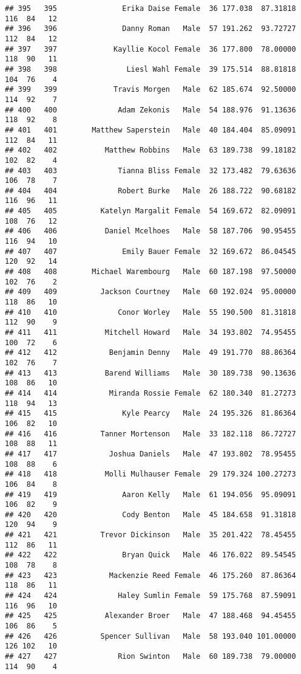 \documentclass[
]{article}
\begin{document}
\begin{verbatim}
## 395   395               Erika Daise Female  36 177.038  87.31818 116  84   12
## 396   396               Danny Roman   Male  57 191.262  93.72727 112  84   12
## 397   397             Kayllie Kocol Female  36 177.800  78.00000 118  90   11
## 398   398                Liesl Wahl Female  39 175.514  88.81818 104  76    4
## 399   399             Travis Morgen   Male  62 185.674  92.50000 114  92    7
## 400   400              Adam Zekonis   Male  54 188.976  91.13636 118  92    8
## 401   401        Matthew Saperstein   Male  40 184.404  85.09091 112  84   11
## 402   402           Matthew Robbins   Male  63 189.738  99.18182 102  82    4
## 403   403              Tianna Bliss Female  32 173.482  79.63636 106  78    7
## 404   404              Robert Burke   Male  26 188.722  90.68182 116  96   11
## 405   405          Katelyn Margalit Female  54 169.672  82.09091 108  76   12
## 406   406           Daniel Mcelhoes   Male  58 187.706  90.95455 116  94   10
## 407   407               Emily Bauer Female  32 169.672  86.04545 120  92   14
## 408   408        Michael Warembourg   Male  60 187.198  97.50000 102  76    2
## 409   409          Jackson Courtney   Male  60 192.024  95.00000 118  86   10
## 410   410              Conor Worley   Male  55 190.500  81.31818 112  90    9
## 411   411           Mitchell Howard   Male  34 193.802  74.95455 100  72    6
## 412   412            Benjamin Denny   Male  49 191.770  88.86364 102  76    7
## 413   413           Barend Williams   Male  30 189.738  90.13636 108  86   10
## 414   414            Miranda Rossie Female  62 180.340  81.27273 118  94   13
## 415   415               Kyle Pearcy   Male  24 195.326  81.86364 106  82   10
## 416   416          Tanner Mortenson   Male  33 182.118  86.72727 108  88   11
## 417   417            Joshua Daniels   Male  47 193.802  78.95455 108  88    6
## 418   418           Molli Mulhauser Female  29 179.324 100.27273 106  84    8
## 419   419               Aaron Kelly   Male  61 194.056  95.09091 106  82    9
## 420   420               Cody Benton   Male  45 184.658  91.31818 120  94    9
## 421   421          Trevor Dickinson   Male  35 201.422  78.45455 112  86   11
## 422   422               Bryan Quick   Male  46 176.022  89.54545 108  78    8
## 423   423            Mackenzie Reed Female  46 175.260  87.86364 118  86   11
## 424   424              Haley Sumlin Female  59 175.768  87.59091 116  96   10
## 425   425           Alexander Broer   Male  47 188.468  94.45455 106  86    5
## 426   426          Spencer Sullivan   Male  58 193.040 101.00000 126 102   10
## 427   427              Rion Swinton   Male  60 189.738  79.00000 114  90    4

\end{verbatim}
\end{document}
